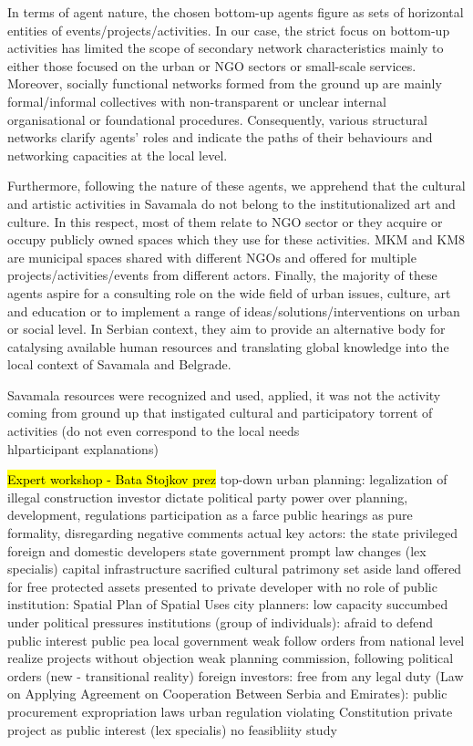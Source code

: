 \documentclass[11pt]{report}
\begin{document}
In terms of agent nature, the chosen bottom-up agents figure as sets of horizontal entities of events/projects/activities. In our case, the strict focus on bottom-up activities has limited the scope of secondary network characteristics mainly to either those focused on the urban or NGO sectors or small-scale services. Moreover, socially functional networks formed from the ground up are mainly formal/informal collectives with non-transparent or unclear internal organisational or foundational procedures. Consequently, various structural networks clarify agents’ roles and indicate the paths of their behaviours and networking capacities at the local level.

Furthermore, following the nature of these agents, we apprehend that the cultural and artistic activities in Savamala do not belong to the institutionalized art and culture. In this respect, most of them relate to NGO sector or they acquire or occupy publicly owned spaces which they use for these activities. MKM and KM8 are municipal spaces shared with different NGOs and offered for multiple projects/activities/events from different actors. Finally, the majority of these agents aspire for a consulting role on the wide field of urban issues, culture, art and education or to implement a range of ideas/solutions/interventions on urban or social level. In Serbian context, they aim to provide an alternative body for catalysing available human resources and translating global knowledge into the local context of Savamala and Belgrade.

Savamala resources were recognized and used, applied, it was not the activity coming from ground up that instigated cultural and participatory torrent of activities (do not even correspond to the local needs \\hl{participant explanations})

\hl{Expert workshop - Bata Stojkov prez}
top-down urban planning:
    legalization of illegal construction
    investor dictate
    political party power over planning, development, regulations
    participation as a farce
    public hearings as pure formality, disregarding negative comments
    actual key actors:
        the state
        privileged foreign and domestic developers
    state government
    prompt law changes (lex specialis)
    capital infrastructure sacrified
    cultural patrimony set aside
    land offered for free
    protected assets presented to private developer with no role of public institution: Spatial Plan of Spatial Uses
city planners:
    low capacity
    succumbed under political pressures
institutions (group of individuals):
    afraid to defend public interest
    public pea
local government
    weak
    follow orders from national level
    realize projects without objection
    weak planning commission, following political orders (new - transitional reality)
foreign  investors:
    free from any legal duty (Law on Applying Agreement on Cooperation Between Serbia and Emirates):
        public procurement
        expropriation
        laws
        urban regulation
    violating Constitution
    private project as public interest (lex specialis)
    no feasibliity study
 
\end{document}
